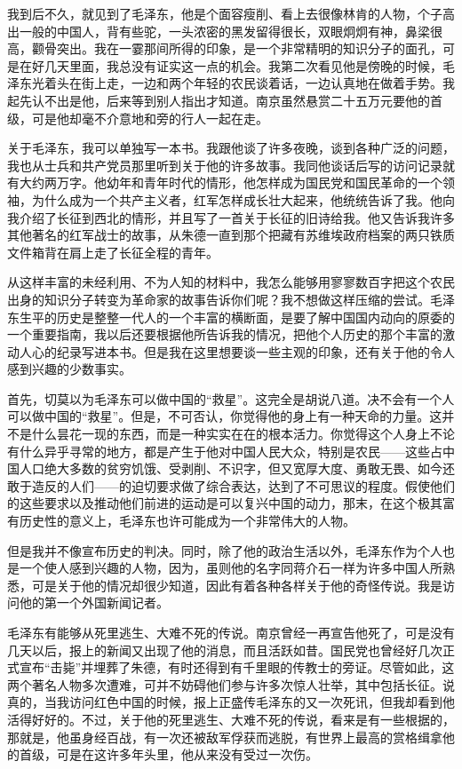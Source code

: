 \documentclass[10pt]{book}
\begin{document}
我到后不久，就见到了毛泽东，他是个面容瘦削、看上去很像林肯的人物，个子高出一般的中国人，背有些驼，一头浓密的黑发留得很长，双眼炯炯有神，鼻梁很高，颧骨突出。我在一霎那间所得的印象，是一个非常精明的知识分子的面孔，可是在好几天里面，我总没有证实这一点的机会。我第二次看见他是傍晚的时候，毛泽东光着头在街上走，一边和两个年轻的农民谈着话，一边认真地在做着手势。我起先认不出是他，后来等到别人指出才知道。南京虽然悬赏二十五万元要他的首级，可是他却毫不介意地和旁的行人一起在走。

关于毛泽东，我可以单独写一本书。我跟他谈了许多夜晚，谈到各种广泛的问题，我也从士兵和共产党员那里听到关于他的许多故事。我同他谈话后写的访问记录就有大约两万字。他幼年和青年时代的情形，他怎样成为国民党和国民革命的一个领袖，为什么成为一个共产主义者，红军怎样成长壮大起来，他统统告诉了我。他向我介绍了长征到西北的情形，并且写了一首关于长征的旧诗给我。他又告诉我许多其他著名的红军战士的故事，从朱德一直到那个把藏有苏维埃政府档案的两只铁质文件箱背在肩上走了长征全程的青年。

从这样丰富的未经利用、不为人知的材料中，我怎么能够用寥寥数百字把这个农民出身的知识分子转变为革命家的故事告诉你们呢？我不想做这样压缩的尝试。毛泽东生平的历史是整整一代人的一个丰富的横断面，是要了解中国国内动向的原委的一个重要指南，我以后还要根据他所告诉我的情况，把他个人历史的那个丰富的激动人心的纪录写进本书。但是我在这里想要谈一些主观的印象，还有关于他的令人感到兴趣的少数事实。

首先，切莫以为毛泽东可以做中国的“救星”。这完全是胡说八道。决不会有一个人可以做中国的“救星”。但是，不可否认，你觉得他的身上有一种天命的力量。这并不是什么昙花一现的东西，而是一种实实在在的根本活力。你觉得这个人身上不论有什么异乎寻常的地方，都是产生于他对中国人民大众，特别是农民——这些占中国人口绝大多数的贫穷饥饿、受剥削、不识字，但又宽厚大度、勇敢无畏、如今还敢于造反的人们——的迫切要求做了综合表达，达到了不可思议的程度。假使他们的这些要求以及推动他们前进的运动是可以复兴中国的动力，那末，在这个极其富有历史性的意义上，毛泽东也许可能成为一个非常伟大的人物。

但是我并不像宣布历史的判决。同时，除了他的政治生活以外，毛泽东作为个人也是一个使人感到兴趣的人物，因为，虽则他的名字同蒋介石一样为许多中国人所熟悉，可是关于他的情况却很少知道，因此有着各种各样关于他的奇怪传说。我是访问他的第一个外国新闻记者。

毛泽东有能够从死里逃生、大难不死的传说。南京曾经一再宣告他死了，可是没有几天以后，报上的新闻又出现了他的消息，而且活跃如昔。国民党也曾经好几次正式宣布“击毙”并埋葬了朱德，有时还得到有千里眼的传教士的旁证。尽管如此，这两个著名人物多次遭难，可并不妨碍他们参与许多次惊人壮举，其中包括长征。说真的，当我访问红色中国的时候，报上正盛传毛泽东的又一次死讯，但我却看到他活得好好的。不过，关于他的死里逃生、大难不死的传说，看来是有一些根据的，那就是，他虽身经百战，有一次还被敌军俘获而逃脱，有世界上最高的赏格缉拿他的首级，可是在这许多年头里，他从来没有受过一次伤。
\end{document}
